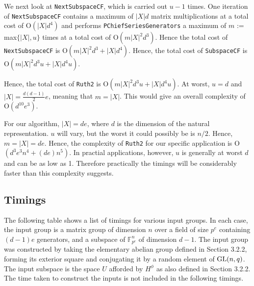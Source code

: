 \documentclass[12pt]{report}
\def\GL{{\rm GL}}
\begin{document}
We next look at {\tt NextSubspaceCF}, which is carried out $u - 1$ times. One iteration of {\tt NextSubspaceCF} contains a maximum of $|X|d$ matrix multiplications at a total cost of O$(|X| d^4)$ and performs {\tt PChiefSeriesGenerators} a maximum of $m$ := max$\{|X|, u\}$ times at a total cost of O$(m |X|^2 d^3)$. Hence the total cost of {\tt NextSubspaceCF} is O$(m |X|^2 d^3 + |X| d^4)$. Hence, the total cost of {\tt SubspaceCF} is O$(m |X|^2 d^3 u + |X| d^4 u)$.

Hence, the total cost of {\tt Ruth2} is O$(m |X|^2 d^3 u + |X| d^4 u)$. At worst, $u = d$ and $|X| = \frac{d(d-1)}{2} e$, meaning that $m = |X|$. This would give an overall complexity of O$(d^{10} e^3)$.

For our algorithm, $|X| = de$, where $d$ is the dimension of the natural representation. $u$ will vary, but the worst it could possibly be is $n/2$. Hence, $m = |X| = d e$. Hence, the complexity of {\tt Ruth2} for our specific application is O$(d^3 e^3 n^4 + (d e) n^5)$. In practial applications, however, $u$ is generally at worst $d$ and can be as low as 1. Therefore practically the timings will be considerably faster than this complexity suggests.

\subsection{Timings}

The following table shows a list of timings for various input groups. In each case, the input group is a matrix group of dimension $n$ over a field of size $p^e$ containing $(d-1)e$ generators, and a subspace of $\mathbb{F}_{p^e}^n$ of dimension $d-1$. The input group was constructed by taking the elementary abelian group defined in Section 3.2.2, forming its exterior square and conjugating it by a random element of $\GL(n, q)$. The input subspace is the space $U$ afforded by $H^\phi$ as also defined in Section 3.2.2. The time taken to construct the inputs is not included in the following timings.
\end{document}
